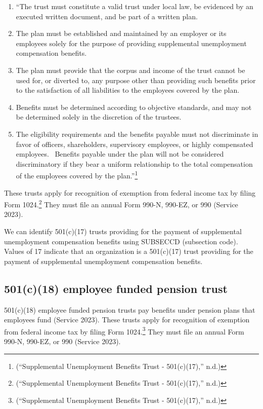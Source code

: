 \documentclass[
  letterpaper,
  DIV=11,
  numbers=noendperiod]{scrreprt}
\begin{document}
\begin{enumerate}
\def\labelenumi{\arabic{enumi}.}
\item
  ``The trust must constitute a valid trust under local law, be
  evidenced by an executed written document, and be part of a written
  plan.
\item
  The plan must be established and maintained by an employer or its
  employees solely for the purpose of providing supplemental
  unemployment compensation benefits.
\item
  The plan must provide that the corpus and income of the trust cannot
  be used for, or diverted to, any purpose other than providing such
  benefits prior to the satisfaction of all liabilities to the employees
  covered by the plan.
\item
  Benefits must be determined according to objective standards, and may
  not be determined solely in the discretion of the trustees.
\item
  The eligibility requirements and the benefits payable must not
  discriminate in favor of officers, shareholders, supervisory
  employees, or highly compensated employees.~ Benefits payable under
  the plan will not be considered discriminatory if they bear a uniform
  relationship to the total compensation of the employees covered by the
  plan.''\footnote{({``Supplemental Unemployment Benefits Trust -
    501(c)(17),''} n.d.)}
\end{enumerate}

These trusts apply for recognition of exemption from federal income tax
by filing Form 1024.\footnote{({``Supplemental Unemployment Benefits
  Trust - 501(c)(17),''} n.d.)} They must file an annual Form 990-N,
990-EZ, or 990 (Service 2023).

We can identify 501(c)(17) trusts providing for the payment of
supplemental unemployment compensation benefits using SUBSECCD
(subsection code). Values of 17 indicate that an organization is a
501(c)(17) trust providing for the payment of supplemental unemployment
compensation benefits.

\hypertarget{c18-employee-funded-pension-trust}{%
\subsection{501(c)(18) employee funded pension
trust}\label{c18-employee-funded-pension-trust}}

501(c)(18) employee funded pension trusts pay benefits under pension
plans that employees fund (Service 2023). These trusts apply for
recognition of exemption from federal income tax by filing Form
1024.\footnote{({``Supplemental Unemployment Benefits Trust -
  501(c)(17),''} n.d.)} They must file an annual Form 990-N, 990-EZ, or
990 (Service 2023).
\end{document}
